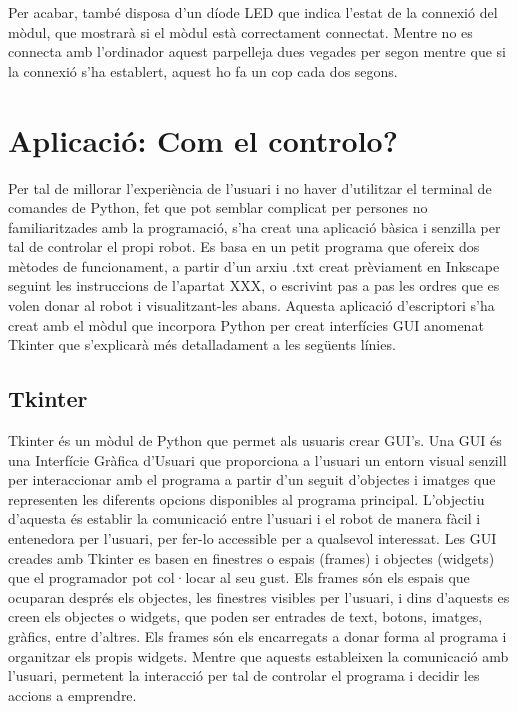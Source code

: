 Per acabar, també disposa d’un díode LED que indica l’estat de la connexió del mòdul, que mostrarà si el mòdul està correctament connectat. Mentre no es connecta amb l’ordinador aquest parpelleja dues vegades per segon mentre que si la connexió s’ha establert,  aquest ho fa un cop cada dos segons. 


\section{Aplicació: Com el controlo?}

Per tal de millorar l’experiència de l’usuari i no haver d’utilitzar el terminal de comandes de Python, fet que pot semblar complicat per persones no familiaritzades amb la programació, s’ha creat una aplicació bàsica i senzilla per tal de controlar el propi robot. Es basa en un petit programa que ofereix dos mètodes de funcionament, a partir d’un arxiu .txt creat prèviament en Inkscape seguint les instruccions de l’apartat XXX, o escrivint pas a pas les ordres que es volen donar al robot i visualitzant-les abans.
Aquesta aplicació d’escriptori s’ha creat amb el mòdul que incorpora Python per creat interfícies GUI anomenat Tkinter que s’explicarà més detalladament a les següents línies. 

\subsection{Tkinter}
Tkinter és un mòdul de Python que permet als usuaris crear GUI’s. Una GUI és una Interfície Gràfica d’Usuari que proporciona a l’usuari un entorn visual senzill per interaccionar amb el programa a partir d’un seguit d’objectes i imatges que representen les diferents opcions disponibles al programa principal. L’objectiu d’aquesta és establir la comunicació entre l’usuari i el robot de manera fàcil i entenedora per l’usuari, per fer-lo accessible per a qualsevol interessat. 
Les GUI creades amb Tkinter es basen en finestres o espais (frames) i objectes (widgets) que el programador pot col·locar al seu gust. Els frames són els espais que ocuparan després els objectes, les finestres visibles per l’usuari, i dins d’aquests es creen els objectes o widgets, que poden ser entrades de text, botons, imatges, gràfics, entre d’altres. Els frames són els encarregats a donar forma al programa i organitzar els propis widgets. Mentre que aquests estableixen la comunicació amb l’usuari, permetent la interacció per tal de controlar el programa i decidir les accions a emprendre. 


